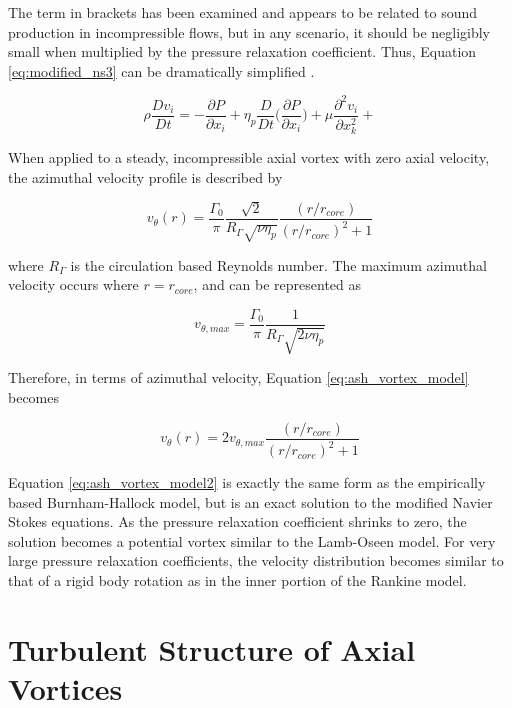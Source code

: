 The term in brackets has been examined and appears to be related to sound 
production 
in incompressible flows, but in any scenario, it should be negligibly small 
when multiplied by the pressure relaxation coefficient. Thus, Equation 
\ref{eq:modified_ns3} can be dramatically simplified \cite{ash2011}.

\begin{equation}
\rho \frac{Dv_i}{Dt} = -\frac{\partial P}{\partial x_i} +
\eta_p \frac{D}{Dt} \Bigg( \frac{\partial P}{\partial x_i} \Bigg) + 
\mu \frac{\partial^2 v_i}{\partial x_{k}^2} + 
\label{eq:modified_ns4}
\end{equation}

When applied to a steady, incompressible axial vortex with zero axial velocity, 
the azimuthal velocity profile is described by

\begin{equation}
v_\theta(r) = \frac{\Gamma_0}{\pi} \frac{\sqrt{2}}{R_\Gamma \sqrt{\nu \eta_p}}
\frac{(r / r_{core})}{(r/r_{core})^2 + 1}
\label{eq:ash_vortex_model}
\end{equation}

\noindent
where $R_\Gamma$ is the circulation based Reynolds number. The maximum 
azimuthal velocity occurs where $r = r_{core}$, and can be represented as

\begin{equation}
v_{\theta, max} = \frac{\Gamma_0}{\pi} \frac{1}{R_\Gamma \sqrt{2 \nu 
\eta_p}}
\label{eq:ash_vthetamax}
\end{equation}

\noindent
Therefore, in terms of azimuthal velocity, Equation \ref{eq:ash_vortex_model} 
becomes

\begin{equation}
v_\theta(r) = 2 v_{\theta, max}\frac{(r / r_{core})}{(r/r_{core})^2 + 1}
\label{eq:ash_vortex_model2}
\end{equation}

Equation \ref{eq:ash_vortex_model2} is exactly the same form as the 
empirically based Burnham-Hallock model, but is an exact solution to the 
modified Navier Stokes equations. As the pressure relaxation coefficient 
shrinks to zero, the solution becomes a potential vortex similar to the 
Lamb-Oseen model. For very large pressure relaxation coefficients, the velocity 
distribution becomes similar to that of a rigid body rotation as in the inner 
portion of the Rankine model.


\section{Turbulent Structure of Axial Vortices}

